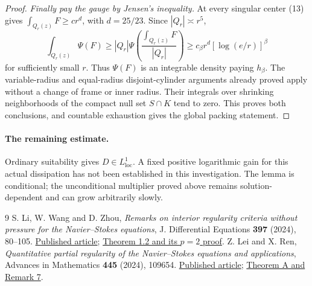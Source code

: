 \documentclass[11pt]{article}
\begin{document}
\begin{proof}
\emph{Finally pay the gauge by Jensen's inequality.}
At every singular center (13) gives $\int_{Q_r(z)}F\ge c r^d$, with $d=25/23$. Since $|Q_r|\asymp r^5$,
$$
\int_{Q_r(z)}\Psi(F)
\ge |Q_r|\Psi\!\left(\frac{\int_{Q_r(z)}F}{|Q_r|}\right)
\ge c_\beta r^d[\log(e/r)]^\beta
$$
for sufficiently small $r$. Thus $\Psi(F)$ is an integrable density paying $h_\beta$. The variable-radius and equal-radius disjoint-cylinder arguments already proved apply without a change of frame or inner radius. Their integrals over shrinking neighborhoods of the compact null set $S\cap K$ tend to zero. This proves both conclusions, and countable exhaustion gives the global packing statement.
\end{proof}

\paragraph{The remaining estimate.}
Ordinary suitability gives $D\in L^1_{\mathrm{loc}}$. A fixed positive logarithmic gain for this actual dissipation has not been established in this investigation. The lemma is conditional; the unconditional multiplier proved above remains solution-dependent and can grow arbitrarily slowly.

\begin{thebibliography}{9}
 S. Li, W. Wang and D. Zhou,
\emph{Remarks on interior regularity criteria without pressure for the Navier--Stokes equations},
J. Differential Equations \textbf{397} (2024), 80--105.
\href{https://doi.org/10.1016/j.jde.2024.03.006}{Published article};
\href{https://arxiv.org/pdf/2305.00698}{Theorem 1.2 and its $p=2$ proof}.
 Z. Lei and X. Ren,
\emph{Quantitative partial regularity of the Navier--Stokes equations and applications},
Advances in Mathematics \textbf{445} (2024), 109654.
\href{https://doi.org/10.1016/j.aim.2024.109654}{Published article};
\href{https://arxiv.org/pdf/2210.01783}{Theorem A and Remark 7}.
\end{thebibliography}
\end{document}
